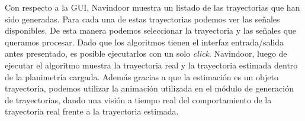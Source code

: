 Con respecto a la GUI, Navindoor muestra un listado de las trayectorias que han sido generadas. Para cada una de estas trayectorias podemos ver las señales disponibles. De esta manera podemos seleccionar la trayectoria y las señales que queramos procesar. Dado que los algoritmos tienen el interfaz entrada/salida antes presentado, es posible ejecutarlos con un solo \emph{click}. Navindoor, luego de ejecutar el algoritmo muestra la trayectoria real y la trayectoria estimada dentro de la planimetría cargada. Además gracias a que la estimación es un objeto trayectoria, podemos utilizar la animación utilizada en el módulo de generación de trayectorias, dando una visión a tiempo real del comportamiento de la trayectoria real frente a la trayectoria estimada.